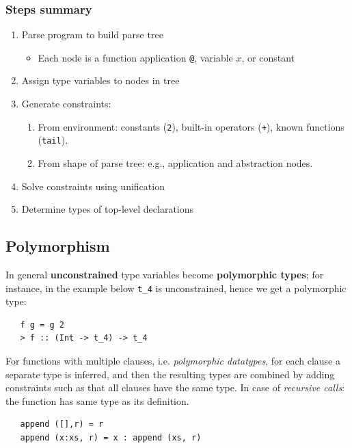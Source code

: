 \subsubsection{Steps summary}
\begin{enumerate}
   \item Parse program to build parse tree
   \begin{itemize}
      \item Each node is a function application \lstinline|@|, variable $x$, or constant
   \end{itemize}
   \item Assign type variables to nodes in tree
   \item Generate constraints:
   \begin{enumerate}
      \item From environment: constants (\lstinline|2|), built-in
      operators (\lstinline|+|), known functions (\lstinline|tail|).
      \item From shape of parse tree: e.g., application and
      abstraction nodes.
   \end{enumerate}
   \item Solve constraints using unification
   \item Determine types of top-level declarations
\end{enumerate}

\subsection{Polymorphism}

In general \textbf{unconstrained} type variables become \textbf{polymorphic types};
for instance, in the example below \lstinline|t_4| is unconstrained, hence we get a polymorphic type:
\begin{lstlisting}
   f g = g 2
   > f :: (Int -> t_4) -> t_4
\end{lstlisting}
\nl

For functions with multiple clauses, i.e. \textit{polymorphic datatypes},
for each clause a separate type is inferred, 
and then the resulting types are combined by adding constraints such as that all clauses have the same type.
In case of \textit{recursive calls}:
the function has same type as its definition.

\begin{lstlisting}
   append ([],r) = r
   append (x:xs, r) = x : append (xs, r)
\end{lstlisting}

